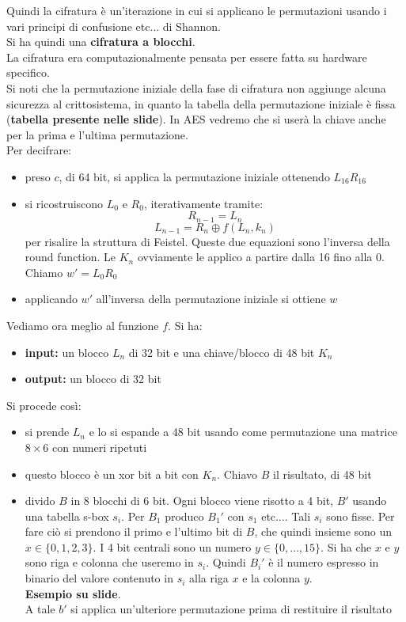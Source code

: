 \documentclass[a4paper,12pt, oneside]{book}
\begin{document}
Quindi la cifratura è un'iterazione in cui si applicano le permutazioni usando i
vari principi di confusione etc$\ldots$ di Shannon.\\
Si ha quindi una \textbf{cifratura a blocchi}.\\
La cifratura era computazionalmente pensata per essere fatta su hardware
specifico. \\
Si noti che la permutazione iniziale della fase di cifratura non aggiunge alcuna
sicurezza al crittosistema, in quanto la tabella della permutazione iniziale
è fissa (\textbf{tabella presente nelle slide}). In AES vedremo che si userà la
chiave anche per la prima e l'ultima permutazione.\\
Per decifrare:
\begin{itemize}
  \item preso $c$, di 64 bit, si applica la permutazione iniziale ottenendo
  $L_{16}R_{16}$
  \item si ricostruiscono $L_0$ e $R_0$, iterativamente tramite:
  \[R_{n-1}=L_n\]
  \[L_{n-1}=R_n\oplus f(L_n,k_n)\]
  per risalire la struttura di Feistel. Queste due equazioni sono l'inversa
  della round function. Le $K_n$ ovviamente le applico a partire
  dalla 16 fino alla 0.\\
  Chiamo $w'=L_0R_0$
  \item applicando $w'$ all'inversa della permutazione iniziale si ottiene $w$
\end{itemize}
Vediamo ora meglio al funzione $f$. Si ha:
\begin{itemize}
  \item \textbf{input:} un blocco $L_n$ di 32 bit e una chiave/blocco di 48 bit
  $K_n$ 
  \item \textbf{output:} un blocco di 32 bit
\end{itemize}
Si procede così:
\begin{itemize}
  \item si prende $L_n$ e lo si espande a 48 bit usando come permutazione una
  matrice $8\times 6$ con numeri ripetuti
  \item questo blocco è un xor bit a bit con $K_n$. Chiavo $B$ il risultato, di
  48 bit
  \item divido $B$ in 8 blocchi di 6 bit. Ogni blocco viene risotto a 4 bit,
  $B'$  usando una tabella s-box $s_i$. Per $B_1$ produco $B_1'$ con $s_1$
  etc$\ldots$. Tali $s_i$ sono fisse. Per fare ciò si prendono il primo e
  l'ultimo bit di $B$, che quindi insieme sono un $x\in\{0,1,2,3\}$. I 4 bit
  centrali sono un numero $y\in\{0,\ldots,15\}$. Si ha che $x$ e $y$ sono riga e
  colonna che useremo in $s_i$. Quindi $B_i'$ è il numero espresso in binario
  del valore contenuto in $s_i$ alla riga $x$ e la colonna $y$.\\
  \textbf{Esempio su slide}.\\
  A tale $b'$ si applica un'ulteriore permutazione prima di restituire il
  risultato 
\end{itemize}
\end{document}
